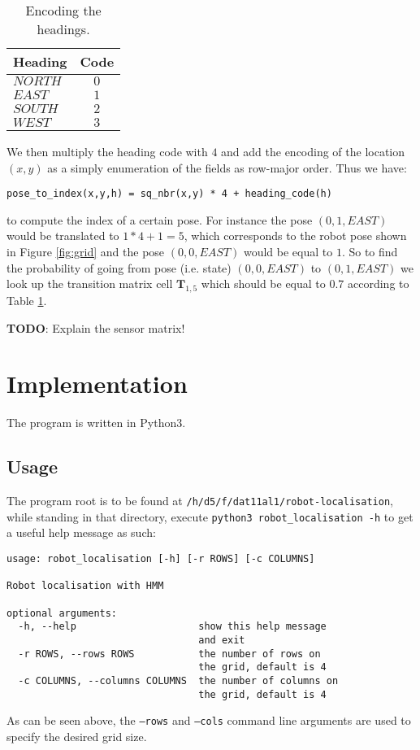 \documentclass{article}
\begin{document}
\begin{table}[ht]
\centering
  \begin{tabular}{ | l | c | }
    \hline
    \textbf{Heading}    & \textbf{Code}   \\ \hline
    $NORTH$             & $0$             \\ \hline
    $EAST$              & $1$             \\ \hline
    $SOUTH$             & $2$             \\ \hline
    $WEST$              & $3$             \\ \hline
  \end{tabular}
  \caption{Encoding the headings.}
  \label{tab:headings}
\end{table}
We then multiply the heading code with $4$ and add the encoding of the location $(x,y)$ as a simply enumeration of the fields as row-major order. Thus we have:
\begin{lstlisting}
pose_to_index(x,y,h) = sq_nbr(x,y) * 4 + heading_code(h)
\end{lstlisting} to compute the index of a certain pose. For instance the pose $(0,1,EAST)$ would be translated to $1*4 + 1 = 5$, which corresponds to the robot pose shown in Figure \ref{fig:grid} and the pose $(0,0,EAST)$ would be equal to $1$. So to find the probability of going from pose (i.e. state) $(0,0,EAST)$ to $(0,1,EAST)$ we look up the transition matrix cell $\textbf{T}_{1, 5}$ which should be equal to $0.7$ according to Table \ref{tab:headings}.

\textbf{TODO}: Explain the sensor matrix!

\section{Implementation}
The program is written in Python3.

\subsection{Usage}
The program root is to be found at \texttt{/h/d5/f/dat11al1/robot-localisation}, while standing in that directory, execute \texttt{python3 robot\_localisation -h} to get a useful help message as such:
\begin{lstlisting}
usage: robot_localisation [-h] [-r ROWS] [-c COLUMNS]

Robot localisation with HMM

optional arguments:
  -h, --help                     show this help message
                                 and exit
  -r ROWS, --rows ROWS           the number of rows on
                                 the grid, default is 4
  -c COLUMNS, --columns COLUMNS  the number of columns on
                                 the grid, default is 4
\end{lstlisting}
As can be seen above, the \texttt{--rows} and \texttt{--cols} command line arguments are used to specify the desired grid size.
\end{document}
